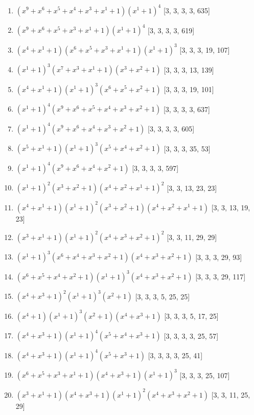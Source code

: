\documentclass[10pt,twocolumn]{article}
\begin{document}
\begin{enumerate}
\item $(x^{9} + x^{6} + x^{5} + x^{4} + x^{3} + x^{1} + 1)(x^{1} + 1)^{4}$  [3, 3, 3, 3, 635]
\item $(x^{9} + x^{6} + x^{5} + x^{3} + x^{1} + 1)(x^{1} + 1)^{4}$  [3, 3, 3, 3, 619]
\item $(x^{4} + x^{1} + 1)(x^{6} + x^{5} + x^{3} + x^{1} + 1)(x^{1} + 1)^{3}$  [3, 3, 3, 19, 107]
\item $(x^{1} + 1)^{3}(x^{7} + x^{3} + x^{1} + 1)(x^{3} + x^{2} + 1)$  [3, 3, 3, 13, 139]
\item $(x^{4} + x^{1} + 1)(x^{1} + 1)^{3}(x^{6} + x^{5} + x^{2} + 1)$  [3, 3, 3, 19, 101]
\item $(x^{1} + 1)^{4}(x^{9} + x^{6} + x^{5} + x^{4} + x^{3} + x^{2} + 1)$  [3, 3, 3, 3, 637]
\item $(x^{1} + 1)^{4}(x^{9} + x^{6} + x^{4} + x^{3} + x^{2} + 1)$  [3, 3, 3, 3, 605]
\item $(x^{5} + x^{1} + 1)(x^{1} + 1)^{3}(x^{5} + x^{4} + x^{2} + 1)$  [3, 3, 3, 35, 53]
\item $(x^{1} + 1)^{4}(x^{9} + x^{6} + x^{4} + x^{2} + 1)$  [3, 3, 3, 3, 597]
\item $(x^{1} + 1)^{2}(x^{3} + x^{2} + 1)(x^{4} + x^{2} + x^{1} + 1)^{2}$  [3, 3, 13, 23, 23]
\item $(x^{4} + x^{1} + 1)(x^{1} + 1)^{2}(x^{3} + x^{2} + 1)(x^{4} + x^{2} + x^{1} + 1)$  [3, 3, 13, 19, 23]
\item $(x^{3} + x^{1} + 1)(x^{1} + 1)^{2}(x^{4} + x^{3} + x^{2} + 1)^{2}$  [3, 3, 11, 29, 29]
\item $(x^{1} + 1)^{3}(x^{6} + x^{4} + x^{3} + x^{2} + 1)(x^{4} + x^{3} + x^{2} + 1)$  [3, 3, 3, 29, 93]
\item $(x^{6} + x^{5} + x^{4} + x^{2} + 1)(x^{1} + 1)^{3}(x^{4} + x^{3} + x^{2} + 1)$  [3, 3, 3, 29, 117]
\item $(x^{4} + x^{3} + 1)^{2}(x^{1} + 1)^{3}(x^{2} + 1)$  [3, 3, 3, 5, 25, 25]
\item $(x^{4} + 1)(x^{1} + 1)^{3}(x^{2} + 1)(x^{4} + x^{3} + 1)$  [3, 3, 3, 5, 17, 25]
\item $(x^{4} + x^{3} + 1)(x^{1} + 1)^{4}(x^{5} + x^{4} + x^{3} + 1)$  [3, 3, 3, 3, 25, 57]
\item $(x^{4} + x^{3} + 1)(x^{1} + 1)^{4}(x^{5} + x^{3} + 1)$  [3, 3, 3, 3, 25, 41]
\item $(x^{6} + x^{5} + x^{3} + x^{1} + 1)(x^{4} + x^{3} + 1)(x^{1} + 1)^{3}$  [3, 3, 3, 25, 107]
\item $(x^{3} + x^{1} + 1)(x^{4} + x^{3} + 1)(x^{1} + 1)^{2}(x^{4} + x^{3} + x^{2} + 1)$  [3, 3, 11, 25, 29]

\end{enumerate}
\end{document}
